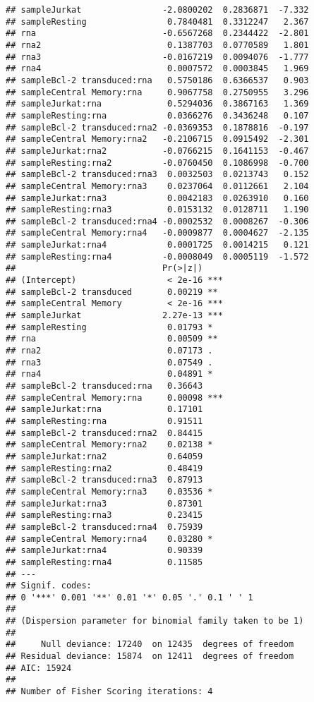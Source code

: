 \documentclass[../../sherrill-Mix_thesis.tex]{subfiles}
\makeatletter
\newenvironment{kframe}{%
 \def\at@end@of@kframe{}%
 \ifinner\ifhmode%
  \def\at@end@of@kframe{\end{minipage}}%
  \begin{minipage}{\columnwidth}%
 \fi\fi%
 \def\FrameCommand##1{\hskip\@totalleftmargin \hskip-\fboxsep
 \colorbox{shadecolor}{##1}\hskip-\fboxsep
     \hskip-\linewidth \hskip-\@totalleftmargin \hskip\columnwidth}%
 \MakeFramed {\advance\hsize-\width
   \@totalleftmargin\z@ \linewidth\hsize
   \@setminipage}}%
 {\par\unskip\endMakeFramed%
 \at@end@of@kframe}
\newenvironment{knitrout}{}{} %
\makeatother
\begin{document}
\begin{knitrout}
\begin{kframe}
\begin{lstlisting}[basicstyle=\ttfamily,breaklines=true]
## sampleJurkat                -2.0800202  0.2836871  -7.332
## sampleResting                0.7840481  0.3312247   2.367
## rna                         -0.6567268  0.2344422  -2.801
## rna2                         0.1387703  0.0770589   1.801
## rna3                        -0.0167219  0.0094076  -1.777
## rna4                         0.0007572  0.0003845   1.969
## sampleBcl-2 transduced:rna   0.5750186  0.6366537   0.903
## sampleCentral Memory:rna     0.9067758  0.2750955   3.296
## sampleJurkat:rna             0.5294036  0.3867163   1.369
## sampleResting:rna            0.0366276  0.3436248   0.107
## sampleBcl-2 transduced:rna2 -0.0369353  0.1878816  -0.197
## sampleCentral Memory:rna2   -0.2106715  0.0915492  -2.301
## sampleJurkat:rna2           -0.0766215  0.1641153  -0.467
## sampleResting:rna2          -0.0760450  0.1086998  -0.700
## sampleBcl-2 transduced:rna3  0.0032503  0.0213743   0.152
## sampleCentral Memory:rna3    0.0237064  0.0112661   2.104
## sampleJurkat:rna3            0.0042183  0.0263910   0.160
## sampleResting:rna3           0.0153132  0.0128711   1.190
## sampleBcl-2 transduced:rna4 -0.0002532  0.0008267  -0.306
## sampleCentral Memory:rna4   -0.0009877  0.0004627  -2.135
## sampleJurkat:rna4            0.0001725  0.0014215   0.121
## sampleResting:rna4          -0.0008049  0.0005119  -1.572
##                             Pr(>|z|)    
## (Intercept)                  < 2e-16 ***
## sampleBcl-2 transduced       0.00219 ** 
## sampleCentral Memory         < 2e-16 ***
## sampleJurkat                2.27e-13 ***
## sampleResting                0.01793 *  
## rna                          0.00509 ** 
## rna2                         0.07173 .  
## rna3                         0.07549 .  
## rna4                         0.04891 *  
## sampleBcl-2 transduced:rna   0.36643    
## sampleCentral Memory:rna     0.00098 ***
## sampleJurkat:rna             0.17101    
## sampleResting:rna            0.91511    
## sampleBcl-2 transduced:rna2  0.84415    
## sampleCentral Memory:rna2    0.02138 *  
## sampleJurkat:rna2            0.64059    
## sampleResting:rna2           0.48419    
## sampleBcl-2 transduced:rna3  0.87913    
## sampleCentral Memory:rna3    0.03536 *  
## sampleJurkat:rna3            0.87301    
## sampleResting:rna3           0.23415    
## sampleBcl-2 transduced:rna4  0.75939    
## sampleCentral Memory:rna4    0.03280 *  
## sampleJurkat:rna4            0.90339    
## sampleResting:rna4           0.11585    
## ---
## Signif. codes:  
## 0 '***' 0.001 '**' 0.01 '*' 0.05 '.' 0.1 ' ' 1
## 
## (Dispersion parameter for binomial family taken to be 1)
## 
##     Null deviance: 17240  on 12435  degrees of freedom
## Residual deviance: 15874  on 12411  degrees of freedom
## AIC: 15924
## 
## Number of Fisher Scoring iterations: 4
\end{lstlisting}
\end{kframe}
\end{knitrout}
\end{document}

